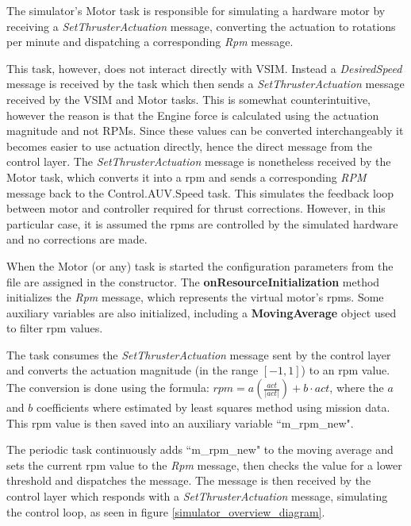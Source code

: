\documentclass[10pt,a4paper]{article}
\begin{document}
\par The simulator's Motor task is responsible for simulating a hardware motor by receiving a \textit{SetThrusterActuation} message, converting the actuation to rotations per minute and dispatching a corresponding \textit{Rpm} message. 

\par This task, however, does not interact directly with VSIM. Instead a \textit{DesiredSpeed} message is received by the  task which then sends a \textit{SetThrusterActuation} message received by the VSIM and Motor tasks. This is somewhat counterintuitive, however the reason is that the Engine force is calculated using the actuation magnitude and not RPMs. Since these values can be converted interchangeably it becomes easier to use actuation directly, hence the direct message from the control layer. The \textit{SetThrusterActuation} message is nonetheless received by the Motor task, which converts it into a rpm and sends a corresponding \textit{RPM} message back to the Control.AUV.Speed task. This simulates the feedback loop between motor and controller required for thrust corrections. However, in this particular case, it is assumed the rpms are controlled by the simulated hardware and no corrections are made.

\par When the Motor (or any) task is started the configuration parameters from the  file are assigned in the constructor. The \textbf{onResourceInitialization} method initializes the \textit{Rpm} message, which represents the virtual motor's rpms. Some auxiliary variables are also initialized, including a \textbf{MovingAverage} object used to filter rpm values.

\par The task consumes the \textit{SetThrusterActuation} message sent by the control layer and converts the actuation magnitude (in the range $\left[-1, 1\right]$) to an rpm value. The conversion is done using the formula: $rpm =  a\left(\frac{act}{\left| act \right|}\right) + b \cdot act$, where the $a$ and $b$ coefficients where estimated by least squares method using mission data. This rpm value is then saved into an auxiliary variable ``m\_rpm\_new".

\par The periodic task continuously adds ``m\_rpm\_new" to the moving average and sets the current rpm value to the \textit{Rpm} message, then checks the value for a lower threshold and dispatches the message. The message is then received by the control layer which responds with a \textit{SetThrusterActuation} message, simulating the control loop, as seen in figure \ref{simulator_overview_diagram}.
\end{document}
